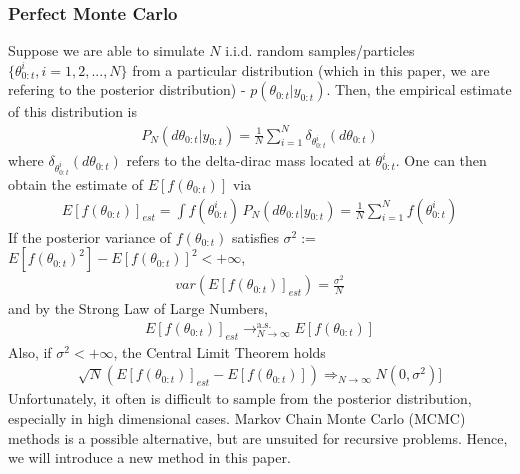 \documentclass[11pt]{article}
\theoremstyle{definition}
\begin{document}
\subsubsection{Perfect Monte Carlo}
Suppose we are able to simulate $N$ i.i.d. random samples/particles $\{\theta_{0:t}^{i},i=1,2,...,N\}$ from a particular distribution (which in this paper, we are refering to the posterior distribution) - $p(\theta_{0:t}|y_{0:t})$. Then, the empirical estimate of this distribution is
\begin{equation}
	\begin{aligned}
		P_{N}(d\theta_{0:t}|y_{0:t}) = \frac{1}{N}\sum_{i=1}^{N}\delta_{\theta_{0:t}^{i}}(d\theta_{0:t})
	\end{aligned}
\end{equation}
where $\delta_{\theta_{0:t}^{i}}(d\theta_{0:t})$ refers to the delta-dirac mass located at $\theta_{0:t}^{i}$. One can then obtain the estimate of $E[f(\theta_{0:t})]$ via
\begin{equation}
	\begin{aligned}
		E[f(\theta_{0:t})]_{est} = \int f(\theta_{0:t}^{i}) \,P_{N}(d\theta_{0:t}|y_{0:t}) = \frac{1}{N}\sum_{i=1}^{N}f(\theta_{0:t}^{i})
	\end{aligned}
\end{equation}
If the posterior variance of $f(\theta_{0:t})$ satisfies \(\sigma^{2} :=\) $E[f(\theta_{0:t})^{2}] - E[f(\theta_{0:t})]^{2} < + \infty $, 
\begin{equation}
	\begin{aligned}
		var(E[f(\theta_{0:t})]_{est}) = \frac{\sigma^{2}}{N}
	\end{aligned}
\end{equation}
and by the Strong Law of Large Numbers,
\begin{equation}
	\begin{aligned}
		E[f(\theta_{0:t})]_{est} \mathrel{\mathop{\rightarrow}^{\mathrm{a.s.}}_{N \rightarrow \infty}} E[f(\theta_{0:t})]
	\end{aligned}
\end{equation}
Also, if $\sigma^{2} < +\infty$, the Central Limit Theorem holds
\begin{equation}
	\begin{aligned}
		\sqrt{N}(E[f(\theta_{0:t})]_{est} - E[f(\theta_{0:t})]) \mathrel{\mathop{\Longrightarrow}_{N \rightarrow \infty}} N(0,\sigma^{2})]
	\end{aligned}
\end{equation}
Unfortunately, it often is difficult to sample from the posterior distribution, especially in high dimensional cases. Markov Chain Monte Carlo (MCMC) methods is a possible alternative, but are unsuited for recursive problems. Hence, we will introduce a new method in this paper.
\end{document}
